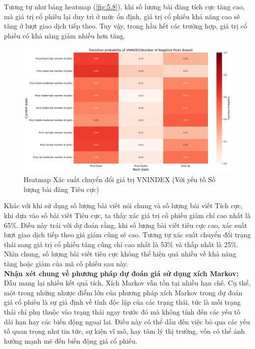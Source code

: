 Tương tự như bảng heatmap (\ref{fig:5.8}), khi số lượng bài đăng tích cực tăng cao, mà giá trị cổ phiếu lại duy trì ở mức ổn định, giá trị cổ phiếu khả năng cao sẽ tăng ở lượt giao dịch tiếp theo. Tuy vậy, trong hầu hết các trường hợp, giá trị cổ phiếu có khả năng giảm nhiều hơn tăng.

\begin{figure}[H]
    \centering
    \includegraphics[width=0.95\linewidth]{images/C2_pic13.png}
    \vspace{-1em}
    \caption{Heatmap Xác suất chuyển đổi giá trị VNINDEX (Với yếu tố Số lượng bài đăng Tiêu cực)}
    \label{fig:5.10}
\end{figure}
Khác với khi sử dụng số lượng bài viết nói chung và số lượng bài viết Tích cực, khi dựa vào số bài viết Tiêu cực, ta thấy xác giá trị cố phiếu giảm chỉ cao nhất là 65\%. Điều này trái với dự đoán rằng, khi số lượng bài viết tiêu cực cao, xác suất lượt giao dịch tiếp theo giá giảm cũng sẽ cao. Tương tự xác suất chuyển đổi trạng thái sang giá trị cổ phiếu tăng cũng chỉ cao nhất là 53\% và thấp nhất là 25\%. Nhìn chung, số lượng bài viết tiêu cực không thể hiện quá nhiều về khả năng tăng hoặc giảm của mã cố phiếu sau này.\\

\textbf{Nhận xét chung về phương pháp dự đoán giá sử dụng xích Markov:} Dẫu mang lại nhiều kết quả tích, Xích Markov vẫn tồn tại nhiều hạn chế. Cụ thể, một trong những nhược điểm lớn của phương pháp xích Markov trong dự đoán giá cổ phiếu là sự giả định về tính độc lập của các trạng thái, tức là mỗi trạng thái chỉ phụ thuộc vào trạng thái ngay trước đó mà không tính đến các yếu tố dài hạn hay các biến động ngoại lai. Điều này có thể dẫn đến việc bỏ qua các yếu tố quan trọng như tin tức, sự kiện vĩ mô, hay tâm lý thị trường, vốn có thể ảnh hưởng mạnh mẽ đến biến động giá cổ phiếu. \\

